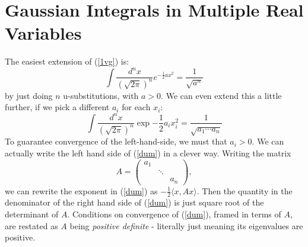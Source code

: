 \documentclass{book}
\begin{document}
\section{Gaussian Integrals in Multiple Real Variables}

The easiest extension of (\ref{1vg}) is:
\[
\int \frac{d^n x}{\left(\sqrt{2\pi}\right)^n} e^{-\frac{1}{2} a x^2 } = \frac{1}{\sqrt{a^n}}
\]
by just doing $n$ u-substitutions, with $a > 0$. We can even extend this a little further, if we pick a different $a_i$ for each $x_i$:
\begin{equation} \label{dum}
\int \frac{d^n x}{\left(\sqrt{2\pi}\right)^n} \exp{-\frac{1}{2} a_i x_i^2} = \frac{1}{\sqrt{a_1 \cdots a_n}}
\end{equation}
To guarantee convergence of the left-hand-side, we must that $a_i > 0$. We can actually write the left hand side of (\ref{dum}) in a clever way. Writing the matrix 
\[
A = \begin{pmatrix}
a_1 & \\
& \ddots \\
& & a_n
\end{pmatrix},
\]
we can rewrite the exponent in (\ref{dum}) as $-\frac{1}{2}\langle x, A x \rangle$. Then the quantity in the denominator of the right hand side of (\ref{dum}) is just square root of the determinant of $A$. Conditions on convergence of (\ref{dum}), framed in terms of $A$, are restated as $A$ being \textit{positive definite} - literally just meaning its eigenvalues are positive. 
\end{document}
